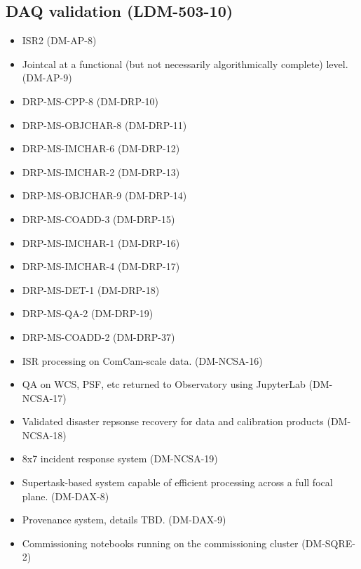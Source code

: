 \subsection{DAQ validation \textbf{(LDM-503-10)}\label{LDM-503-10}}
\begin{itemize}
\item ISR2		(DM-AP-8)
\item Jointcal at a functional (but not necessarily algorithmically complete) level.		(DM-AP-9)
\item DRP-MS-CPP-8		(DM-DRP-10)
\item DRP-MS-OBJCHAR-8		(DM-DRP-11)
\item DRP-MS-IMCHAR-6		(DM-DRP-12)
\item DRP-MS-IMCHAR-2		(DM-DRP-13)
\item DRP-MS-OBJCHAR-9		(DM-DRP-14)
\item DRP-MS-COADD-3		(DM-DRP-15)
\item DRP-MS-IMCHAR-1		(DM-DRP-16)
\item DRP-MS-IMCHAR-4		(DM-DRP-17)
\item DRP-MS-DET-1		(DM-DRP-18)
\item DRP-MS-QA-2		(DM-DRP-19)
\item DRP-MS-COADD-2		(DM-DRP-37)
\item ISR processing on ComCam-scale data.		(DM-NCSA-16)
\item QA on WCS, PSF, etc returned to Observatory using JupyterLab		(DM-NCSA-17)
\item Validated disaster repsonse recovery for data and calibration products		(DM-NCSA-18)
\item 8x7 incident response system		(DM-NCSA-19)
\item Supertask-based system capable of efficient processing across a full focal plane.		(DM-DAX-8)
\item Provenance system, details TBD.		(DM-DAX-9)
\item Commissioning notebooks running on the commissioning cluster		(DM-SQRE-2)
\end{itemize}

